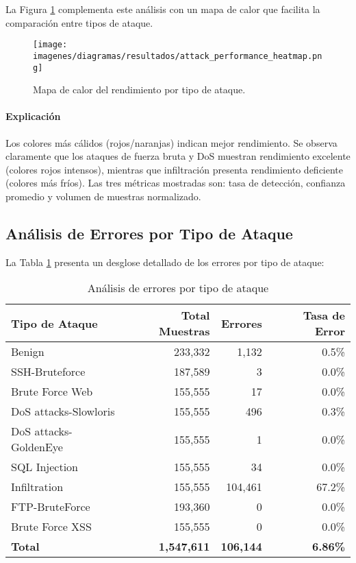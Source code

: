 La Figura \ref{fig:attack_heatmap} complementa este análisis con un mapa de calor que facilita la comparación entre tipos de ataque.

\begin{figure}[H]
\centering
\texttt{[image: imagenes/diagramas/resultados/attack\_performance\_heatmap.png]}
\caption{Mapa de calor del rendimiento por tipo de ataque.}
\label{fig:attack_heatmap}
\end{figure}

\paragraph{Explicación}
Los colores más cálidos (rojos/naranjas) indican mejor rendimiento. Se observa claramente que los ataques de fuerza bruta y DoS muestran rendimiento excelente (colores rojos intensos), mientras que infiltración presenta rendimiento deficiente (colores más fríos). Las tres métricas mostradas son: tasa de detección, confianza promedio y volumen de muestras normalizado.

\subsection{Análisis de Errores por Tipo de Ataque}

La Tabla \ref{tab:error_analysis} presenta un desglose detallado de los errores por tipo de ataque:

\begin{table}[H]
\centering
\begin{tabular}{lrrr}
\toprule
\textbf{Tipo de Ataque} & \textbf{Total Muestras} & \textbf{Errores} & \textbf{Tasa de Error} \\
\midrule
Benign & 233,332 & 1,132 & 0.5\% \\
SSH-Bruteforce & 187,589 & 3 & 0.0\% \\
Brute Force Web & 155,555 & 17 & 0.0\% \\
DoS attacks-Slowloris & 155,555 & 496 & 0.3\% \\
DoS attacks-GoldenEye & 155,555 & 1 & 0.0\% \\
SQL Injection & 155,555 & 34 & 0.0\% \\
Infiltration & 155,555 & 104,461 & 67.2\% \\
FTP-BruteForce & 193,360 & 0 & 0.0\% \\
Brute Force XSS & 155,555 & 0 & 0.0\% \\
\midrule
\textbf{Total} & \textbf{1,547,611} & \textbf{106,144} & \textbf{6.86\%} \\
\bottomrule
\end{tabular}
\caption{Análisis de errores por tipo de ataque}
\label{tab:error_analysis}
\end{table}

